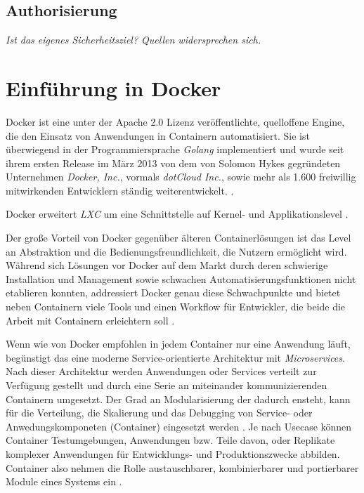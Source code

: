 \documentclass[../main.tex]{subfiles}
\begin{document}
    \subsection{Authorisierung}
      \emph{Ist das eigenes Sicherheitsziel? Quellen widersprechen sich.}

  \section{Einführung in Docker}
  \label{dockerIntro}
    Docker ist eine unter der Apache 2.0 Lizenz veröffentlichte, quelloffene Engine, die den Einsatz von Anwendungen in Containern automatisiert. Sie ist überwiegend in der Programmiersprache \emph{Golang} implementiert und wurde seit ihrem ersten Release im März 2013 von dem von Solomon Hykes gegründeten Unternehmen \emph{Docker, Inc.}\cite{dockerHykes}, vormals \emph{dotCloud Inc.}, sowie mehr als 1.600 freiwillig mitwirkenden Entwicklern ständig weiterentwickelt. \cite{githubDocker}\cite[S.7]{dockerBook}\cite{githubDockerChangelog}\cite{dockerCompany}.

    Docker erweitert \emph{LXC} um eine Schnittstelle auf Kernel- und Applikationslevel \cite[S.2]{dockerLXCKub}.



    Der große Vorteil von Docker gegenüber älteren Containerlösungen ist das Level an Abstraktion und die Bedienungsfreundlichkeit, die Nutzern ermöglicht wird. Während sich Lösungen vor Docker auf dem Markt durch deren schwierige Installation und Management sowie schwachen Automatisierungsfunktionen nicht etablieren konnten, addressiert Docker genau diese Schwachpunkte \cite[S.7]{dockerBook} und bietet neben Containern viele Tools und einen Workflow für Entwickler, die beide die Arbeit mit Containern erleichtern soll \cite[S.1]{dockerIntroIEEE}.


    Wenn wie von Docker empfohlen in jedem Container nur eine Anwendung läuft, begünstigt das eine moderne Service-orientierte Architektur mit \emph{Microservices}. Nach dieser Architektur werden Anwendungen oder Services verteilt zur Verfügung gestellt und durch eine Serie an miteinander kommunizierenden Containern umgesetzt. Der Grad an Modularisierung der dadurch ensteht, kann für die Verteilung, die Skalierung und das Debugging von Service- oder Anwedungskomponeten (Container) eingesetzt werden \cite[S.9]{dockerBook}. Je nach Usecase können Container Testumgebungen, Anwendungen bzw. Teile davon, oder Replikate komplexer Anwendungen für Entwicklungs- und Produktionszwecke abbilden. Container also nehmen die Rolle austauschbarer, kombinierbarer und portierbarer Module eines Systems ein \cite[S.12]{dockerBook}.
\end{document}
